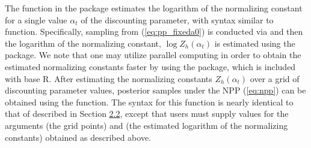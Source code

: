 \begin{algorithm}
  \SetAlgoLined

  \caption{Posterior Sampling under the Normalized Power Prior}
  \label{alg:npp}
\end{algorithm}

The function  in the  package estimates the logarithm of the normalizing constant for a single value $\alpha_{t}$ of the discounting parameter, with syntax similar to  function. Specifically, sampling from (\ref{eq:pp_fixeda0}) is conducted via  and then the logarithm of the normalizing constant, $\log Z_h(\alpha_{t})$ is estimated using the  package.
We note that one may utilize parallel computing in order to obtain the estimated normalizing constants faster by using the  package, which is included with base R. After estimating the normalizing constants $Z_h(\alpha_{t})$ over a grid of discounting parameter values, posterior samples under the NPP (\ref{eq:npp}) can be obtained using the  function.
The syntax for this function is nearly identical to that of  described in Section \hyperref[sec:pp]{2.2}, except that users must supply values for the arguments  (the grid points) and  (the estimated logarithm of the normalizing constants) obtained as described above.

